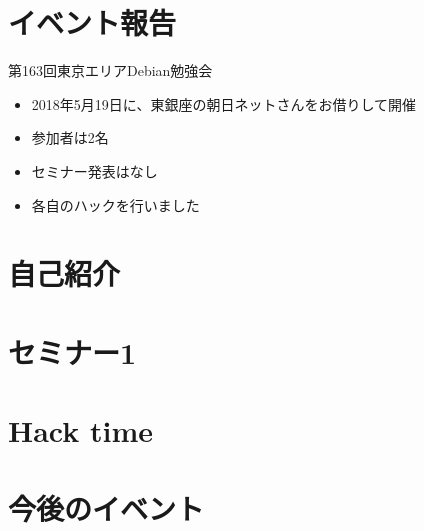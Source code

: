 \section{イベント報告}

\begin{frame}{第163回東京エリアDebian勉強会}
\begin{itemize}
\item 2018年5月19日に、東銀座の朝日ネットさんをお借りして開催
\item 参加者は2名
\item セミナー発表はなし
\item 各自のハックを行いました
\end{itemize} 
\end{frame}


\section{自己紹介}


{\footnotesize
 
}

%

\section{セミナー1}

\section{Hack time}

  
\section{今後のイベント}

